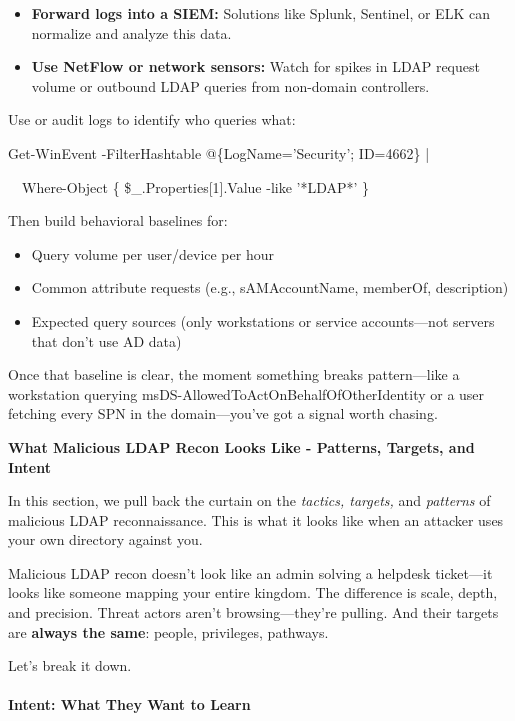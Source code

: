 {{\begin{itemize}
    \item \textbf{Forward logs into a SIEM:} Solutions like Splunk, Sentinel, or ELK can normalize and analyze this data.

    \item \textbf{Use NetFlow or network sensors:} Watch for spikes in LDAP request volume or outbound LDAP queries from non-domain controllers.

\end{itemize}
Use   or audit logs to identify who queries what:

 

 

Get-WinEvent -FilterHashtable @\{LogName='Security'; ID=4662\} |

  Where-Object \{ \$_.Properties[1].Value -like '*LDAP*' \}

Then build behavioral baselines for:

\begin{itemize}
    \item Query volume per user/device per hour

    \item Common attribute requests (e.g., sAMAccountName, memberOf, description)

    \item Expected query sources (only workstations or service accounts—not servers that don’t use AD data)

\end{itemize}
Once that baseline is clear, the moment something breaks pattern—like a workstation querying msDS-AllowedToActOnBehalfOfOtherIdentity or a user fetching every SPN in the domain—you’ve got a signal worth chasing.

\textbf{What Malicious LDAP Recon Looks Like - Patterns, Targets, and Intent}

In this section, we pull back the curtain on the \textit{tactics, targets, }and \textit{patterns }of malicious LDAP reconnaissance. This is what it looks like when an attacker uses your own directory against you.

Malicious LDAP recon doesn’t look like an admin solving a helpdesk ticket—it looks like someone mapping your entire kingdom. The difference is scale, depth, and precision. Threat actors aren’t browsing—they’re pulling. And their targets are \textbf{always the same}: people, privileges, pathways.

Let’s break it down.

\paragraph{\textbf{   Intent: What They Want to Learn}}

}}
